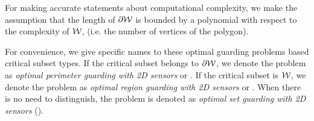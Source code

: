 For making accurate statements about computational complexity, we make
the assumption that the length of $\partial \mathcal W$ is bounded by a polynomial with respect 
to the complexity of $\mathcal W$, (i.e. the number of vertices of the polygon). 

For convenience, we give specific names to these optimal guarding 
problems based critical subset types. If the critical 
subset belongs to $\partial \mathcal W$, we denote the problem as {\em optimal 
perimeter guarding with 2D sensors} or \opgt. If the critical subset 
is $\mathcal W$, we denote the problem as {\em optimal region guarding with 
2D sensors} or \orgt. When there is no need to distinguish, the problem 
is denoted as {\em optimal set guarding with 2D sensors} (\osgt). 

